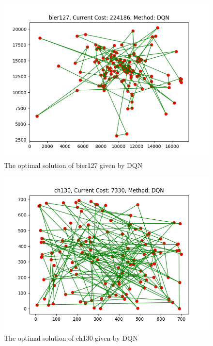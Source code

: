 \documentclass[twocolumn, a4paper]{extarticle}
\begin{document}
\begin{figure}[H]
	\centering
	\includegraphics[width=0.95\linewidth]{figure/DQN_bier127}
	\caption{The optimal solution of bier127 given by DQN}
	\label{fig:firebier127}
\end{figure}

\begin{figure}[H]
	\centering
	\includegraphics[width=0.95\linewidth]{figure/DQN_ch130}
	\caption{The optimal solution of ch130 given by DQN}
	\label{fig:firech130}
\end{figure}
\end{document}
